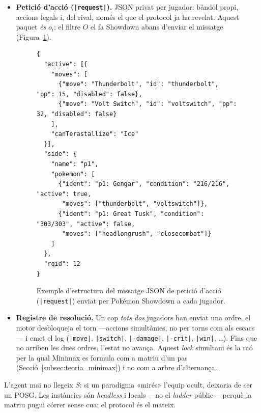 \begin{itemize}
    \item \textbf{Petició d'acció (\texttt{|request|}).} JSON privat per jugador: bàndol propi, accions legals i, del rival, només el que el protocol ja ha revelat. Aquest paquet \emph{és} $o_i$: el filtre $O$ el fa Showdown abans d'enviar el missatge (Figura~\ref{fig:json_request_example}).

          \begin{figure}[htbp]
              \centering
              \begin{minipage}{0.70\linewidth}
                  \begin{scriptsize}
                      \begin{verbatim}
{
  "active": [{
    "moves": [
      {"move": "Thunderbolt", "id": "thunderbolt", "pp": 15, "disabled": false},
      {"move": "Volt Switch", "id": "voltswitch", "pp": 32, "disabled": false}
    ],
    "canTerastallize": "Ice"
  }],
  "side": {
    "name": "p1",
    "pokemon": [
      {"ident": "p1: Gengar", "condition": "216/216", "active": true,
       "moves": ["thunderbolt", "voltswitch"]},
      {"ident": "p1: Great Tusk", "condition": "303/303", "active": false,
       "moves": ["headlongrush", "closecombat"]}
    ]
  },
  "rqid": 12
}
\end{verbatim}
                  \end{scriptsize}
              \end{minipage}
              \caption{Exemple d'estructura del missatge JSON de petició d'acció (\texttt{|request|}) enviat per Pokémon Showdown a cada jugador.}
              \label{fig:json_request_example}
          \end{figure}

    \item \textbf{Registre de resolució.} Un cop \emph{tots dos} jugadors han enviat una ordre, el motor desbloqueja el torn ---accions simultànies, no per torns com als escacs--- i emet el log (\texttt{|move|}, \texttt{|switch|}, \texttt{|-damage|}, \texttt{|-crit|}, \texttt{|win|}, \ldots). Fins que no arriben les dues ordres, l'estat no avança. Aquest \emph{lock} simultani és la raó per la qual Minimax es formula com a matriu d'un pas (Secció~\ref{subsec:teoria_minimax}) i no com a arbre d'alternança.
\end{itemize}

L'agent mai no llegeix $S$: si un paradigma «mirés» l'equip ocult, deixaria de ser un POSG. Les instàncies són \emph{headless} i locals ---no el \emph{ladder} públic--- perquè la matriu pugui córrer sense cua; el protocol és el mateix.

